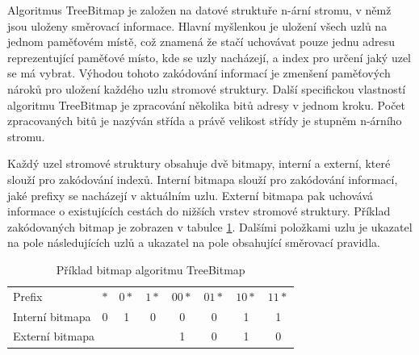Algoritmus TreeBitmap je založen na datové struktuře n-ární stromu, v němž jsou uloženy směrovací informace.
Hlavní myšlenkou je uložení všech uzlů na jednom paměťovém místě, což znamená že stačí uchovávat pouze jednu
adresu reprezentující paměťové místo, kde se uzly nacházejí, a index pro určení jaký uzel se má vybrat.
Výhodou tohoto zakódování informací je zmenšení paměťových nároků pro uložení každého uzlu stromové struktury.
Další specifickou vlastností algoritmu TreeBitmap je zpracování několika bitů adresy v jednom kroku.
Počet zpracovaných bitů je nazýván střída a právě velikost střídy je stupněm n-árního stromu.

Každý uzel stromové struktury obsahuje dvě bitmapy, interní a externí, které slouží pro zakódování indexů.
Interní bitmapa slouží pro zakódování informací, jaké prefixy se nacházejí v aktuálním uzlu.
Externí bitmapa pak uchovává informace o existujících cestách do nižších vrstev stromové struktury.
Příklad zakódovaných bitmap je zobrazen v tabulce \ref{tab:tbm-bitmaps}.
Dalšími položkami uzlu je ukazatel na pole následujících uzlů a ukazatel na pole obsahující směrovací pravidla.

\begin{table}
	\center
	\label{tab:tbm-bitmaps}
    \begin{tabular}{|l||c|c|c|c|c|c|c|}
    \hline
    Prefix & $*$ & $0*$ & $1*$ & $00*$ & $01*$ & $10*$ & $11*$ \\ \hhline{|=#=|=|=|=|=|=|=|}
    Interní bitmapa & 0 & 1 & 0 & 0 & 0 & 1 & 1 \\ \hline
    \multicolumn{4}{|l|}{Externí bitmapa} & 1 & 0 & 1 & 0 \\ \hline
    \end{tabular}
    \caption{Příklad bitmap algoritmu TreeBitmap}
\end{table}

